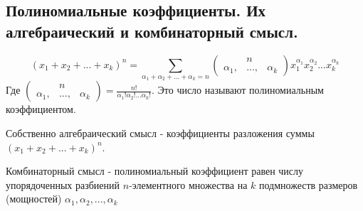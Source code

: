 \subsection{Полиномиальные коэффициенты. Их алгебраический и комбинаторный смысл.}
$$(x_1 + x_2 + ... + x_k)^n = \sum_{\alpha_1+\alpha_2+...+\alpha_k=n}\begin{pmatrix}&n\\\alpha_1,&...,&\alpha_k\end{pmatrix}x_1^{\alpha_1}x_2^{\alpha_2}...x_k^{\alpha_k}$$
Где $\begin{pmatrix}&n\\\alpha_1,&...,&\alpha_k\end{pmatrix} = \frac{n!}{\alpha_1!\alpha_2!...\alpha_k!}$. Это число называют полиномиальным коэффициентом. 

Собственно алгебраический смысл - коэффициенты разложения суммы $(x_1 + x_2 + ... + x_k)^n$.

Комбинаторный смысл - полиномиальный коэффициент равен числу упорядоченных разбиений $n$-элементного множества на $k$ подмножеств размеров (мощностей) $\alpha_1, \alpha_2,...,\alpha_k$
